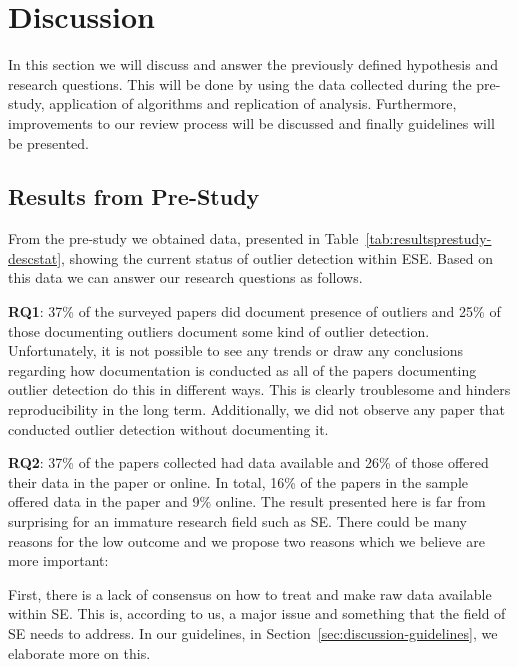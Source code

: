 ﻿\section{Discussion}
\label{sec:discussion}
In this section we will discuss and answer the previously defined hypothesis and research questions. This will be done by using the data collected during the pre-study, application of algorithms and replication of analysis. Furthermore, improvements to our review process will be discussed and finally guidelines will be presented.


\subsection{Results from Pre-Study}
\label{sec:discussion-resultsprestudy}
From the pre-study we obtained data, presented in Table~\ref{tab:resultsprestudy-descstat}, showing the current status of outlier detection within ESE. Based on this data we can answer our research questions as follows.


\textbf{RQ1}: 37\% of the surveyed papers did document presence of outliers and 25\% of those documenting outliers document some kind of outlier detection. Unfortunately, it is not possible to see any trends or draw any conclusions regarding how documentation is conducted as all of the papers documenting outlier detection do this in different ways. This is clearly troublesome and hinders reproducibility in the long term. Additionally, we did not observe any paper that conducted outlier detection without documenting it.


\textbf{RQ2}: 37\% of the papers collected had data available and 26\% of those offered their data in the paper or online. In total, 16\% of the papers in the sample offered data in the paper and 9\% online. The result presented here is far from surprising for an immature research field such as SE\@. There could be many reasons for the low outcome and we propose two reasons which we believe are more important: 


First, there is a lack of consensus on how to treat and make raw data available within SE\@. This is, according to us, a major issue and something that the field of SE needs to address. In our guidelines, in Section~\ref{sec:discussion-guidelines}, we elaborate more on this.


